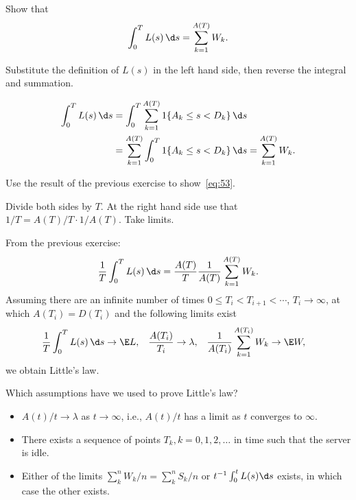\begin{exercise}
  Show that 
\begin{equation*}
  \int_0^T L(s)\, \d s  =  \sum_{k=1}^{A(T)} W_k.
\end{equation*}
\begin{hint}
  Substitute the definition of $L(s)$ in the left hand side, then reverse the integral and summation.
\end{hint}
\begin{solution}
\begin{equation*}
  \begin{split}
  \int_0^T L(s)\, \d s & = \int_0^T \sum_{k=1}^{A(T)} 1\{A_k \leq s < D_k\} \, \d s \\
& =  \sum_{k=1}^{A(T)}\int_0^T  1\{A_k \leq s < D_k\} \, \d s =  \sum_{k=1}^{A(T)} W_k.
  \end{split}
\end{equation*}
\end{solution}
\end{exercise}


\begin{exercise}
  Use the result of the previous exercise to show~\eqref{eq:53}. 
\begin{hint}
  Divide both sides by $T$. At the right hand side use that $1/T =  A(T)/T \cdot 1/A(T)$. Take limits.
\end{hint}
\begin{solution}
From the previous exercise:
\begin{equation*}
  \frac 1 T  \int_0^T L(s)\, \d s  = \frac{A(T)} T \frac{1}{A(T)} \sum_{k=1}^{A(T)} W_k.
\end{equation*}
Assuming there are an infinite number of times
$0\leq T_i<T_{i+1}<\cdots$, $T_i\to\infty$, at which $A(T_i) = D(T_i)$
and the following limits exist
\begin{align*}
\frac 1 T  \int_0^T L(s)\, \d s &\to \E L,&
\frac{A(T_i)}{T_i} &\to \lambda, &
\frac{1}{A(T_i)} \sum_{k=1}^{A(T_i)} W_k &\to \E W,
\end{align*}
we obtain  Little's law.
\end{solution}
\end{exercise}



\begin{exercise}
 Which assumptions have we used to prove Little's law?
  \begin{solution}
    \begin{itemize}
    \item 
 $A(t)/t \to \lambda$ as $t\to \infty$, i.e., $A(t)/t$ has a limit as $t$ converges to $\infty$. 
  \item There exists a sequence of points $T_k, k=0,1,2,\ldots$ in time such that the server is idle. 
  \item Either of the limits $\sum_k^n W_k/n = \sum_k^n S_k /n $ or
    $t^{-1}\int_0^t L(s) \d s$ exists, in which case the other exists.
    \end{itemize}
  \end{solution}
\end{exercise}

